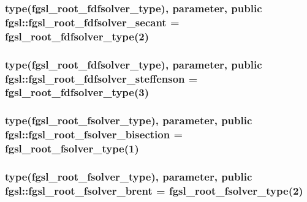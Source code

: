 \hypertarget{classfgsl_a52cb2fcd33e5ad5b7bf7303a8b47764a}{
\subsubsection[{fgsl\-\_\-root\-\_\-fdfsolver\-\_\-secant}]{\setlength{\rightskip}{0pt plus 5cm}type({\bf fgsl\-\_\-root\-\_\-fdfsolver\-\_\-type}), parameter, public fgsl\-::fgsl\-\_\-root\-\_\-fdfsolver\-\_\-secant = {\bf fgsl\-\_\-root\-\_\-fdfsolver\-\_\-type}(2)}}\label{classfgsl_a52cb2fcd33e5ad5b7bf7303a8b47764a}
\hypertarget{classfgsl_aca4a5d84619cc9678ec442a1f33741aa}{
\subsubsection[{fgsl\-\_\-root\-\_\-fdfsolver\-\_\-steffenson}]{\setlength{\rightskip}{0pt plus 5cm}type({\bf fgsl\-\_\-root\-\_\-fdfsolver\-\_\-type}), parameter, public fgsl\-::fgsl\-\_\-root\-\_\-fdfsolver\-\_\-steffenson = {\bf fgsl\-\_\-root\-\_\-fdfsolver\-\_\-type}(3)}}\label{classfgsl_aca4a5d84619cc9678ec442a1f33741aa}
\hypertarget{classfgsl_aa7dc27fd2c5eda5bdd57f4936c041faf}{
\subsubsection[{fgsl\-\_\-root\-\_\-fsolver\-\_\-bisection}]{\setlength{\rightskip}{0pt plus 5cm}type({\bf fgsl\-\_\-root\-\_\-fsolver\-\_\-type}), parameter, public fgsl\-::fgsl\-\_\-root\-\_\-fsolver\-\_\-bisection = {\bf fgsl\-\_\-root\-\_\-fsolver\-\_\-type}(1)}}\label{classfgsl_aa7dc27fd2c5eda5bdd57f4936c041faf}
\hypertarget{classfgsl_a097401e95907837ed18233ae594898d2}{
\subsubsection[{fgsl\-\_\-root\-\_\-fsolver\-\_\-brent}]{\setlength{\rightskip}{0pt plus 5cm}type({\bf fgsl\-\_\-root\-\_\-fsolver\-\_\-type}), parameter, public fgsl\-::fgsl\-\_\-root\-\_\-fsolver\-\_\-brent = {\bf fgsl\-\_\-root\-\_\-fsolver\-\_\-type}(2)}}\label{classfgsl_a097401e95907837ed18233ae594898d2}
